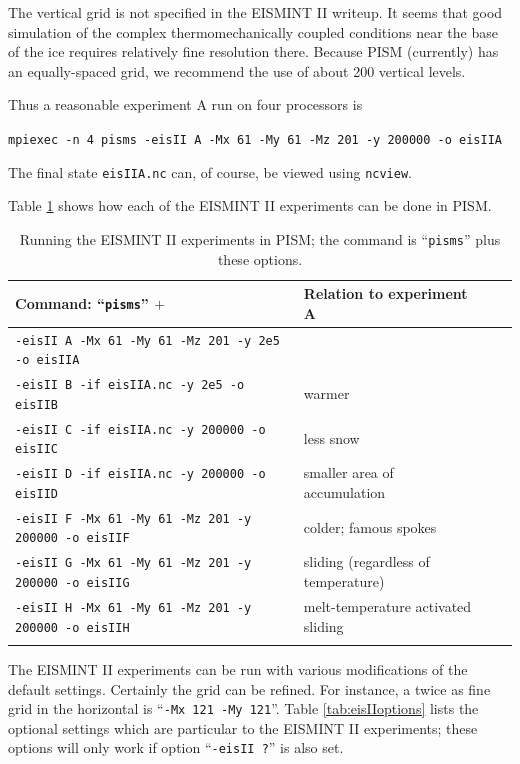 \documentclass[11pt,final]{amsart}
\renewcommand{\t}[1]{\texttt{#1}}
\begin{document}
The vertical grid is not specified in the EISMINT II writeup.  It seems that good simulation of the complex thermomechanically coupled conditions near the base of the ice requires relatively fine resolution there.  Because PISM (currently) has an equally-spaced grid, we recommend the use of about 200 vertical levels.

Thus a reasonable experiment A run on four processors is

\verb|mpiexec -n 4 pisms -eisII A -Mx 61 -My 61 -Mz 201 -y 200000 -o eisIIA|

\noindent The final state \verb|eisIIA.nc| can, of course, be viewed using \verb|ncview|.

Table \ref{tab:eisII} shows how each of the EISMINT II experiments can be done in PISM.

\begin{table}[h]
\caption{Running the EISMINT II experiments in PISM; the command is ``\t{pisms}'' plus these options.}\label{tab:eisII}
\small
\begin{tabular}{@{}llll}\hline
\textbf{Command: ``\t{pisms}'' $+$} & \textbf{Relation to experiment A} \\ \hline
\verb|-eisII A -Mx 61 -My 61 -Mz 201 -y 2e5 -o eisIIA| & \\
\verb|-eisII B -if eisIIA.nc -y 2e5 -o eisIIB| & warmer \\
\verb|-eisII C -if eisIIA.nc -y 200000 -o eisIIC| & less snow \\
\verb|-eisII D -if eisIIA.nc -y 200000 -o eisIID| & smaller area of accumulation \\
\verb|-eisII F -Mx 61 -My 61 -Mz 201 -y 200000 -o eisIIF| & colder; famous spokes \cite{BBL} \\
\verb|-eisII G -Mx 61 -My 61 -Mz 201 -y 200000 -o eisIIG| & sliding (regardless of temperature) \\
\verb|-eisII H -Mx 61 -My 61 -Mz 201 -y 200000 -o eisIIH| & melt-temperature activated sliding \\
\hline\normalsize
\end{tabular}\end{table}

The EISMINT II experiments can be run with various modifications of the default settings.  Certainly the grid can be refined.  For instance, a twice as fine grid in the horizontal is ``\t{-Mx 121 -My 121}''.  Table \ref{tab:eisIIoptions} lists the optional settings which are particular to the EISMINT II experiments; these options will only work if option ``\t{-eisII ?}'' is also set.
\end{document}
